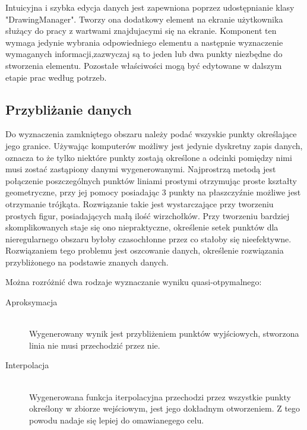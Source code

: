 Intuicyjna i szybka edycja danych jest zapewniona poprzez udostępnianie klasy "DrawingManager". Tworzy ona dodatkowy element na ekranie użytkownika służący do pracy z wartwami znajdujacymi się na ekranie. Komponent ten wymaga jedynie wybrania odpowiedniego elementu a następnie wyznaczenie wymaganych informacji,zazwyczaj są to jeden lub dwa punkty niezbędne do stworzenia elementu. Pozostałe właściwości mogą być edytowane w dalszym etapie prac według potrzeb.


\subsection{Przybliżanie danych}
\label{subsec:aproksymacja}

Do wyznaczenia zamkniętego obszaru należy podać wszyskie punkty określające jego granice. Używając komputerów możliwy jest jedynie dyskretny zapis danych, oznacza to że tylko niektóre punkty zostają określone a odcinki pomiędzy nimi musi zostać zastąpiony danymi wygenerowanymi. Najprostrzą metodą jest połączenie poszczególnych punktów liniami prostymi otrzymując proste kształty geometryczne, przy jej pomocy posiadając 3 punkty na płaszczyźnie możliwe jest otrzymanie trójkąta. Rozwiązanie takie jest wystarczające przy tworzeniu prostych figur, posiadających małą ilość wirzchołków. Przy tworzeniu bardziej skomplikowanych staje się ono niepraktyczne, określenie setek punktów dla nieregularnego obszaru byłoby czasochłonne przez co stałoby się nieefektywne. Rozwiązaniem tego problemu jest oszcowanie danych, określenie rozwiązania przybliżonego na podstawie znanych danych.



Można rozróżnić dwa rodzaje wyznaczanie wyniku quasi-otpymalnego:

\begin{description}
\item[Aproksymacja] \hfill \\
    Wygenerowany wynik jest przybliżeniem punktów wyjściowych, stworzona linia nie  musi przechodzić przez nie.

\item[Interpolacja] \hfill \\
    Wygenerowana funkcja iterpolacyjna przechodzi przez wszystkie punkty określony w zbiorze wejściowym, jest jego dokładnym otworzeniem. Z tego powodu nadaje się lepiej do omawianegego celu.

\end{description}


